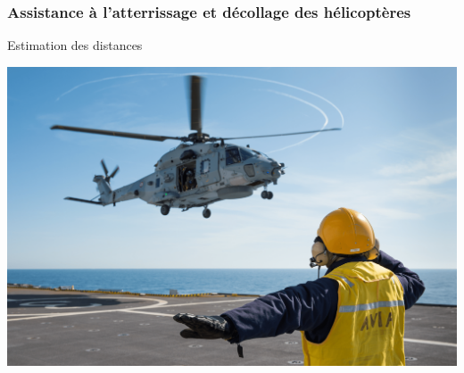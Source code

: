 \begin{frame}
	\frametitle{Assistance à l'atterrissage et décollage des hélicoptères}
	Estimation des distances
	\vspace{0.2cm}
	\begin{center}
		\includegraphics[scale=0.5]{images/porteavion.png}
	\end{center}
\end{frame}
%	
%			
